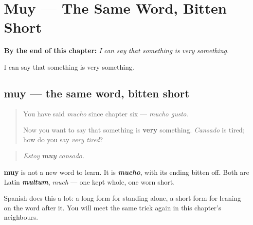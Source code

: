 
\chapter{Muy --- The Same Word, Bitten Short}
\label{ch:muy}

\begin{chapteropening}
\textbf{By the end of this chapter:} \emph{I can say that something is very something.}

I can say that something is very something.
\end{chapteropening}

\section[muy]{muy — the same word, bitten short}

\label{lesson:ES-C60-muy}



\begin{quote}
You have said \emph{mucho} since chapter six — \emph{mucho gusto}.

Now you want to say that something is \textbf{very} something. \emph{Cansado} is tired; how do you say \emph{very tired}?
\end{quote}

\begin{cousinweb}
\begin{quote}
\emph{Estoy} \emph{\textbf{muy}} \emph{cansado.}
\end{quote}

\textbf{muy} is not a new word to learn. It is \emph{\textbf{mucho}}, with its ending bitten off. Both are Latin \emph{\textbf{multum}}, \emph{much} — one kept whole, one worn short.

Spanish does this a lot: a long form for standing alone, a short form for leaning on the word after it. You will meet the same trick again in this chapter's neighbours.
\end{cousinweb}

